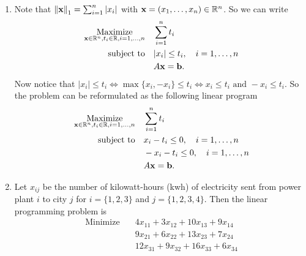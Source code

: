\begin{enumerate}
\begin{enumerate}[label=(\alph*)]
          \end{enumerate}
    \item Note that \(\norm{\mathbf{x}}_1 = \sum_{i = 1}^n |x_i|\) with \(\mathbf{x} = (x_1, \dots, x_n) \in \mathbb{R}^n\). So we can write
          \begin{align*}
              \underset{\mathbf{x} \in \mathbb{R}^n, t_i \in \mathbb{R}, i = 1, \dots, n}{\text{Maximize}} \quad & \sum_{i = 1}^n t_i                                                                    \\
              \text{subject to} \quad                                                       & |x_i| \leq t_i, \quad i = 1, \dots, n                                                 \\
                                                                                            & A\mathbf{x}                                                                           = \mathbf{b}.
          \end{align*}
          Now notice that \(|x_i| \leq t_i \iff \max\{x_i, -x_i\} \leq t_i \iff x_i \leq t_i \text{ and } -x_i \leq t_i\). So the problem can be reformulated as the following linear program
          \begin{align*}
              \underset{\mathbf{x} \in \mathbb{R}^n, t_i \in \mathbb{R}, i = 1, \dots, n}{\text{Maximize}} \quad & \sum_{i = 1}^n t_i                       \\
              \text{subject to} \quad                                                       & x_i - t_i \leq 0, \quad i = 1, \dots, n  \\
                                                                                            & -x_i - t_i \leq 0, \quad i = 1, \dots, n \\
                                                                                            & A\mathbf{x} = \mathbf{b}.
          \end{align*}
    \item Let \(x_{ij}\) be the number of kilowatt-hours (kwh) of electricity sent from power plant \(i\) to city \(j\) for \(i = \{1, 2, 3\}\) and \(j = \{1, 2, 3, 4\}\). Then the linear programming problem is
          \begin{align*}
              \text{Minimize} \quad   & 4x_{11} + 3x_{12} + 10x_{13} + 9x_{14}                                    \\
                                      & 9x_{21} + 6x_{22} + 13x_{23} + 7x_{24}                                    \\
                                      & 12x_{31} + 9x_{32} + 16x_{33} + 6x_{34}                                   \\

\end{align*}
\end{enumerate}
